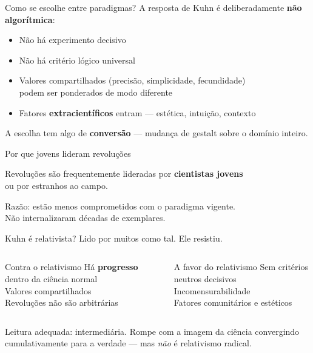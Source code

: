 \documentclass[aspectratio=169]{beamer}
\newcommand{\impt}[1]{\textcolor{maccent}{\textbf{#1}}}
\newcommand{\ntc}[1]{\textcolor{mprimary}{#1}}
\begin{document}
\begin{frame}{Como se escolhe entre paradigmas?}
A resposta de Kuhn é deliberadamente \impt{não algorítmica}:
\vspace{0.3cm}
\pause
\begin{itemize}
  \item Não há experimento decisivo
  \pause
  \item Não há critério lógico universal
  \pause
  \item Valores compartilhados (precisão, simplicidade, fecundidade) \\
  \ntc{podem ser ponderados de modo diferente}
  \pause
  \item Fatores \impt{extracientíficos} entram --- estética, intuição, contexto
\end{itemize}
\vspace{0.4cm}
\pause
\begin{block}{}
A escolha tem algo de \impt{conversão} --- mudança de gestalt sobre o domínio inteiro.
\end{block}
\end{frame}

\begin{frame}{Por que jovens lideram revoluções}
\begin{alertblock}{}
Revoluções são frequentemente lideradas por \impt{cientistas jovens} \\
ou por estranhos ao campo.
\end{alertblock}
\vspace{0.4cm}
\pause
\ntc{Razão:} estão menos comprometidos com o paradigma vigente. \\[0.3cm]
Não internalizaram décadas de exemplares.
\end{frame}

\begin{frame}{Kuhn é relativista?}
Lido por muitos como tal. Ele resistiu.
\vspace{0.3cm}
\pause
\begin{columns}[t]
\begin{block}{Contra o relativismo}
Há \impt{progresso} dentro da ciência normal \\[0.1cm]
Valores compartilhados \\[0.1cm]
Revoluções não são arbitrárias
\end{block}

\pause
\begin{block}{A favor do relativismo}
Sem critérios neutros decisivos \\[0.1cm]
Incomensurabilidade \\[0.1cm]
Fatores comunitários e estéticos
\end{block}
\end{columns}
\vspace{0.5cm}
\pause
\ntc{Leitura adequada:} intermediária. Rompe com a imagem da ciência convergindo cumulativamente para a verdade --- mas \emph{não} é relativismo radical.
\end{frame}
\end{document}
